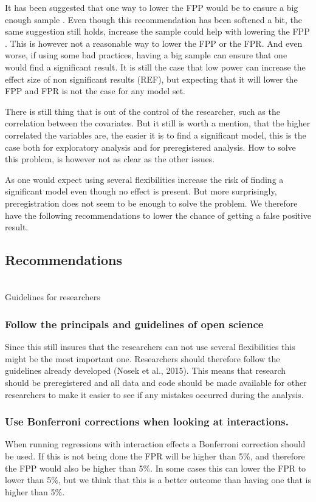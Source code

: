 It has been suggested that one way to lower the FPP would be to ensure a big enough sample \citep{Simmons2011}. Even though this recommendation has been softened a bit, the same suggestion still holds, increase the sample could help with lowering the FPP \cite{simmons2018}. This is however not a reasonable way to lower the FPP or the FPR. And even worse, if using some bad practices, having a big sample can ensure that one would find a significant result. It is still the case that low power can increase the effect size of non significant results (REF), but expecting that it will lower the FPP and FPR is not the case for any model set. 

There is still thing that is out of the control of the researcher, such as the correlation between the covariates. But it still is worth a mention, that the higher correlated the variables are, the easier it is to find a significant model, this is the case both for exploratory analysis and for preregistered analysis. How to solve this problem, is however not as clear as the other issues. 

As one would expect using several flexibilities increase the risk of finding a significant model even though no effect is present. But more surprisingly, preregistration does not seem to be enough to solve the problem. We therefore have the following recommendations to lower the chance of getting a false positive result. 

\subsection{Recommendations}
\hfill\\
Guidelines for researchers 
\hfill\\
\subsubsection{Follow the principals and guidelines of open science}
Since this still insures that the researchers can not use several flexibilities this might be the most important one. Researchers should therefore follow the guidelines already developed (Nosek et al., 2015). This means that research should be preregistered and all data and code should be made available for other researchers to make it easier to see if any mistakes occurred during the analysis. 
\subsubsection{Use Bonferroni corrections when looking at interactions.}
When running regressions with interaction effects a Bonferroni correction should be used. If this is not being done the FPR will be higher than 5\%, and therefore the FPP would also be higher than 5\%. In some cases this can lower the FPR to lower than 5\%, but we think that this is a better outcome than having one that is higher than 5\%. 
